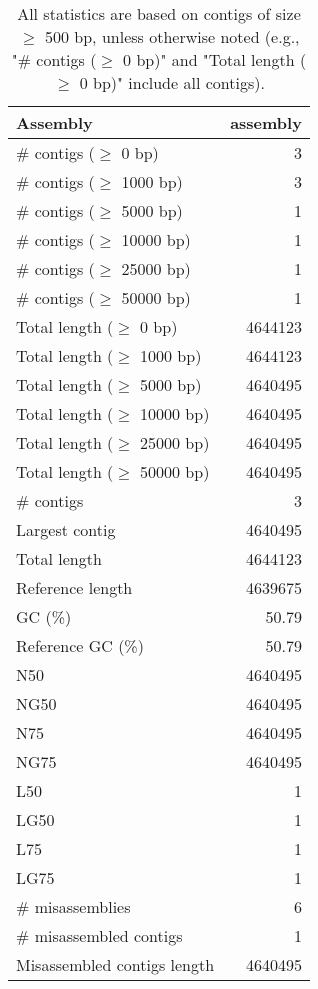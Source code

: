 \documentclass[12pt,a4paper]{article}
\begin{document}
\begin{table}[ht]
\begin{center}
\caption{All statistics are based on contigs of size $\geq$ 500 bp, unless otherwise noted (e.g., "\# contigs ($\geq$ 0 bp)" and "Total length ($\geq$ 0 bp)" include all contigs).}
\begin{tabular}{|l*{1}{|r}|}
\hline
Assembly & assembly \\ \hline
\# contigs ($\geq$ 0 bp) & 3 \\ \hline
\# contigs ($\geq$ 1000 bp) & 3 \\ \hline
\# contigs ($\geq$ 5000 bp) & 1 \\ \hline
\# contigs ($\geq$ 10000 bp) & 1 \\ \hline
\# contigs ($\geq$ 25000 bp) & 1 \\ \hline
\# contigs ($\geq$ 50000 bp) & 1 \\ \hline
Total length ($\geq$ 0 bp) & 4644123 \\ \hline
Total length ($\geq$ 1000 bp) & 4644123 \\ \hline
Total length ($\geq$ 5000 bp) & 4640495 \\ \hline
Total length ($\geq$ 10000 bp) & 4640495 \\ \hline
Total length ($\geq$ 25000 bp) & 4640495 \\ \hline
Total length ($\geq$ 50000 bp) & 4640495 \\ \hline
\# contigs & 3 \\ \hline
Largest contig & 4640495 \\ \hline
Total length & 4644123 \\ \hline
Reference length & 4639675 \\ \hline
GC (\%) & 50.79 \\ \hline
Reference GC (\%) & 50.79 \\ \hline
N50 & 4640495 \\ \hline
NG50 & 4640495 \\ \hline
N75 & 4640495 \\ \hline
NG75 & 4640495 \\ \hline
L50 & 1 \\ \hline
LG50 & 1 \\ \hline
L75 & 1 \\ \hline
LG75 & 1 \\ \hline
\# misassemblies & 6 \\ \hline
\# misassembled contigs & 1 \\ \hline
Misassembled contigs length & 4640495 \\ \hline

\end{tabular}
\end{center}
\end{table}
\end{document}
